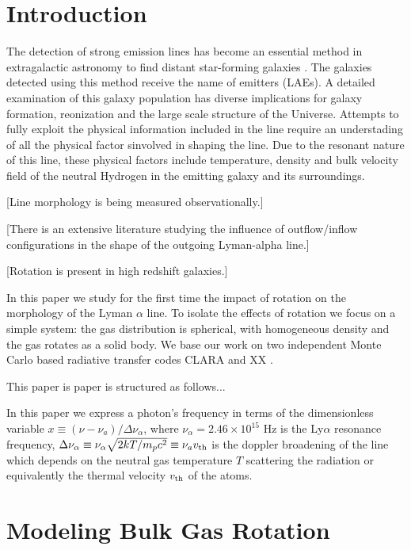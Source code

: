 \documentclass[usenatbib]{mn2e}
\newcommand{\ly}{{\ifmmode{{\rm Ly}\alpha~}\else{Ly$\alpha$~}\fi}}
\begin{document}
\section{Introduction}
\label{sec:intro}

The detection of strong \ly emission lines has become an essential
method in extragalactic astronomy to find distant star-forming
galaxies
\citep{PartridgePeebles,Rhoads00,Gawiser2007,Koehler2007,Ouchi08,Yamada2012,Schenker2012}. The
galaxies detected using this method receive the 
name of \ly emitters (LAEs). A detailed examination of this galaxy
population has diverse implications for galaxy formation, reonization
and the large scale structure of the Universe. Attempts to fully
exploit the physical information included in the \ly line require an
understading of all the physical factor sinvolved in shaping the
line. Due to the resonant nature of this line, these physical factors
include temperature, density and bulk velocity field of the neutral
Hydrogen in the emitting galaxy and its surroundings.


[Line morphology is being measured observationally.]


[There is an extensive literature studying the influence of
outflow/inflow configurations in the shape of the outgoing Lyman-alpha
line.]


[Rotation is present in high redshift galaxies.]

In this paper we study for the first time the impact of rotation on
the morphology of the Lyman $\alpha$ line. To isolate the effects of
rotation we focus on a simple system: the gas distribution is
spherical, with homogeneous density and the gas rotates as a solid
body. We base our work on two independent Monte Carlo based radiative
transfer codes CLARA \citep{CLARA} and XX \citep{DijkstraKramer}.

 
This paper is paper is structured as follows...

In this paper we express a photon's frequency in terms of the
dimensionless variable $x\equiv (\nu -\nu_a)/\Delta\nu_\alpha$, where
$\nu_{\alpha}=2.46\times 10^{15}$ Hz is the Ly$\alpha$ resonance
frequency,  $\Delta\nu_{\alpha} \equiv
\nu_{\alpha}\sqrt{2kT/m_pc^2}\equiv \nu_av_{\rm th} $ is the doppler
broadening of the line which depends on the neutral gas temperature
$T$ scattering the radiation or equivalently the thermal velocity
$v_{\rm th}$ of the atoms. 


\section{Modeling Bulk Gas Rotation}
\label{sec:implementation}
\end{document}
